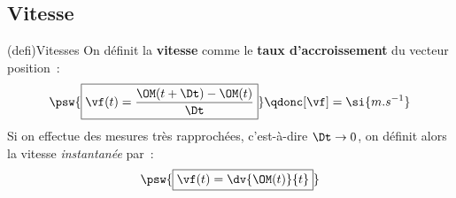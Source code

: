 \documentclass[../../main/main.tex]{subfiles}
\begin{document}
\subsection{Vitesse}
\begin{tcb*}[sidebyside, righthand ratio=.29](defi){Vitesses}
	On définit la \textbf{vitesse} comme le \textbf{taux d'accroissement} du
	vecteur position~:
	\[\psw{\boxed{\vf(t) = \frac{\OM(t+\Dt) - \OM(t)}{\Dt}}}
		\qdonc
		[\vf] = \si{m.s^{-1}}\]
	Si on effectue des mesures très rapprochées, c'est-à-dire $\Dt \rightarrow
		0$, on définit alors la vitesse \textit{instantanée} par~:
	\[\psw{\boxed{\vf(t) = \dv{\OM(t)}{t}}}\]
	\tcblower
	\begin{center}
	\end{center}
\end{tcb*}
\end{document}
